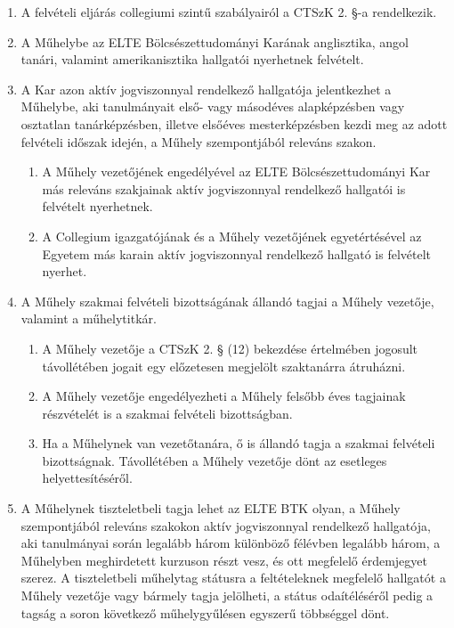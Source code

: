 \documentclass{../styles/rulebook}
\begin{document}
\begin{enumerate}	
	\item  A felvételi eljárás collegiumi szintű szabályairól a CTSzK 2. §-a rendelkezik.
	\item A Műhelybe az ELTE Bölcsészettudományi Karának anglisztika, angol tanári,
	valamint amerikanisztika hallgatói nyerhetnek felvételt.
	\item A Kar azon aktív jogviszonnyal rendelkező hallgatója jelentkezhet a Műhelybe, aki
	tanulmányait első- vagy másodéves alapképzésben vagy osztatlan tanárképzésben,
	illetve elsőéves mesterképzésben kezdi meg az adott felvételi időszak idején, a
	Műhely szempontjából releváns szakon.
	\begin{enumerate}
		\item A Műhely vezetőjének engedélyével az ELTE Bölcsészettudományi Kar más
		releváns szakjainak aktív jogviszonnyal rendelkező hallgatói is felvételt
		nyerhetnek.
		\item A Collegium igazgatójának és a Műhely vezetőjének egyetértésével az Egyetem
		más karain aktív jogviszonnyal rendelkező hallgató is felvételt nyerhet.
	\end{enumerate}
	\item  A Műhely szakmai felvételi bizottságának állandó tagjai a Műhely vezetője, valamint
	a műhelytitkár.
	\begin{enumerate}
		\item A Műhely vezetője a CTSzK 2. § (12) bekezdése értelmében jogosult
		távollétében jogait egy előzetesen megjelölt szaktanárra átruházni.
		\item A Műhely vezetője engedélyezheti a Műhely felsőbb éves tagjainak részvételét
		is a szakmai felvételi bizottságban.
		\item Ha a Műhelynek van vezetőtanára, ő is állandó tagja a szakmai felvételi
		bizottságnak. Távollétében a Műhely vezetője dönt az esetleges helyettesítéséről.
	\end{enumerate}	
	\item  A Műhelynek tiszteletbeli tagja lehet az ELTE BTK olyan, a Műhely szempontjából
	releváns szakokon aktív jogviszonnyal rendelkező hallgatója, aki tanulmányai során legalább három különböző félévben legalább három, a Műhelyben meghirdetett
	kurzuson részt vesz, és ott megfelelő érdemjegyet szerez. A tiszteletbeli műhelytag
	státusra a feltételeknek megfelelő hallgatót a Műhely vezetője vagy bármely tagja
	jelölheti, a státus odaítéléséről pedig a tagság a soron következő műhelygyűlésen
	egyszerű többséggel dönt. 
\end{enumerate}
\end{document}

